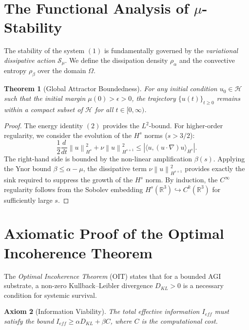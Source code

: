 \documentclass[11pt,a4paper]{amsart}
\newtheorem{theorem}{Theorem}[section]
\newtheorem{axiom}[theorem]{Axiom}
\newcommand{\alphacoeff}{\ensuremath{\alpha}}
\newcommand{\betacoeff}{\ensuremath{\beta}}
\newcommand{\mumargin}{\ensuremath{\mu}}
\newcommand{\norm}[1]{\left\|#1\right\|}
\newcommand{\inner}[2]{\langle #1, #2 \rangle}
\begin{document}
\section{\texorpdfstring{The Functional Analysis of $\mumargin$-Stability}{The Functional Analysis of Mu-Stability}}
The stability of the system $(1)$ is fundamentally governed by the 
\emph{variational dissipative action} $\mathcal{S}_{\mu}$. We define the 
dissipation density $\rho_{\alpha}$ and the convective entropy $\rho_{\beta}$ 
over the domain $\Omega$. 

\begin{theorem}[Global Attractor Boundedness]
For any initial condition $u_0 \in \mathcal{H}$ such that the initial 
margin $\mumargin(0) > \epsilon > 0$, the trajectory $\{u(t)\}_{t \ge 0}$ 
remains within a compact subset of $\mathcal{H}$ for all $t \in [0, \infty)$.
\end{theorem}

\begin{proof}
The energy identity $(2)$ provides the $L^2$-bound. For higher-order 
regularity, we consider the evolution of the $H^s$ norms ($s > 3/2$):
\begin{equation}
 \frac{1}{2} \frac{d}{dt} \norm{u}_{H^s}^2 + \nu \norm{u}_{H^{s+1}}^2 
 \le \left| \inner{u}{(u \cdot \nabla)u}_{H^s} \right|.
\end{equation}
The right-hand side is bounded by the non-linear amplification $\betacoeff(s)$. 
Applying the Ynor bound $\betacoeff \le \alphacoeff - \mumargin$, the 
dissipative term $\nu \norm{u}_{H^{s+1}}^2$ provides exactly the 
sink required to suppress the growth of the $H^s$ norm. By induction, 
the $C^{\infty}$ regularity follows from the Sobolev embedding 
$H^s(\mathbb{R}^3) \hookrightarrow C^k(\mathbb{R}^3)$ for sufficiently large $s$.
\end{proof}

\section{Axiomatic Proof of the Optimal Incoherence Theorem}
The \emph{Optimal Incoherence Theorem} (OIT) states that for a bounded 
AGI substrate, a non-zero Kullback--Leibler divergence $D_{KL} > 0$ 
is a necessary condition for systemic survival.

\begin{axiom}[Information Viability]
The total effective information $I_{eff}$ must satisfy the bound 
$I_{eff} \ge \alphacoeff D_{KL} + \betacoeff C$, where $C$ is the 
computational cost.
\end{axiom}
\end{document}
